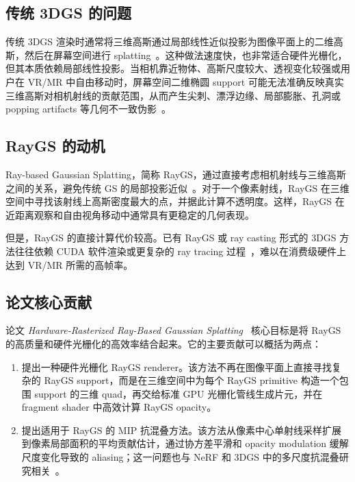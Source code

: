 \documentclass[12pt,hyperref,a4paper,UTF8]{ctexart}
\begin{document}
\subsection{传统 3DGS 的问题}
传统 3DGS 渲染时通常将三维高斯通过局部线性近似投影为图像平面上的二维高斯，然后在屏幕空间进行 splatting~\cite{3dgaussiansplatting}。这种做法速度快，也非常适合硬件光栅化，但其本质依赖局部线性投影。当相机靠近物体、高斯尺度较大、透视变化较强或用户在 VR/MR 中自由移动时，屏幕空间二维椭圆 support 可能无法准确反映真实三维高斯对相机射线的贡献范围，从而产生尖刺、漂浮边缘、局部膨胀、孔洞或 popping artifacts 等几何不一致伪影~\cite{stopthepop,gaussianopacityfields}。



\subsection{RayGS 的动机}
Ray-based Gaussian Splatting，简称 RayGS，通过直接考虑相机射线与三维高斯之间的关系，避免传统 GS 的局部投影近似~\cite{gaussianopacityfields}。对于一个像素射线，RayGS 在三维空间中寻找该射线上高斯密度最大的点，并据此计算不透明度。这样，RayGS 在近距离观察和自由视角移动中通常具有更稳定的几何表现。

但是，RayGS 的直接计算代价较高。已有 RayGS 或 ray casting 形式的 3DGS 方法往往依赖 CUDA 软件渲染或更复杂的 ray tracing 过程~\cite{gaussianopacityfields}，难以在消费级硬件上达到 VR/MR 所需的高帧率。



\subsection{论文核心贡献}
论文 \emph{Hardware-Rasterized Ray-Based Gaussian Splatting}~\cite{hardwarerasterizedraybasedgaussiansplatting} 核心目标是将 RayGS 的高质量和硬件光栅化的高效率结合起来。它的主要贡献可以概括为两点：

\begin{enumerate}
    \item 提出一种硬件光栅化 RayGS renderer。该方法不再在图像平面上直接寻找复杂的 RayGS support，而是在三维空间中为每个 RayGS primitive 构造一个包围 support 的三维 quad，再交给标准 GPU 光栅化管线生成片元，并在 fragment shader 中高效计算 RayGS opacity。
    \item 提出适用于 RayGS 的 MIP 抗混叠方法。该方法从像素中心单射线采样扩展到像素局部面积的平均贡献估计，通过协方差平滑和 opacity modulation 缓解尺度变化导致的 aliasing；这一问题也与 NeRF 和 3DGS 中的多尺度抗混叠研究相关~\cite{mipnerf360,mipsplatting}。
\end{enumerate}
\end{document}
